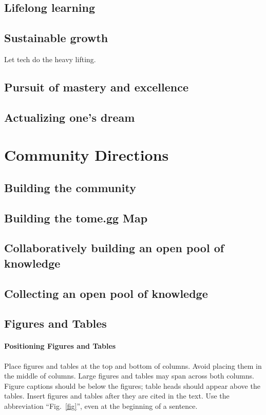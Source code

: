\documentclass[journal, onecolumn]{IEEEtran}
\begin{document}
\subsection{Lifelong learning}

\subsection{Sustainable growth}

Let tech do the heavy lifting.

\subsection{Pursuit of mastery and excellence}

\subsection{Actualizing one's dream}


\section{Community Directions}
\label{sec:community_directions}

\subsection{Building the community}

\subsection{Building the tome.gg Map}

\subsection{Collaboratively building an open pool of knowledge}

\subsection{Collecting an open pool of knowledge}


\subsection{Figures and Tables}
\paragraph{Positioning Figures and Tables} Place figures and tables at the top and 
bottom of columns. Avoid placing them in the middle of columns. Large 
figures and tables may span across both columns. Figure captions should be 
below the figures; table heads should appear above the tables. Insert 
figures and tables after they are cited in the text. Use the abbreviation 
``Fig.~\ref{fig}'', even at the beginning of a sentence.
\end{document}
